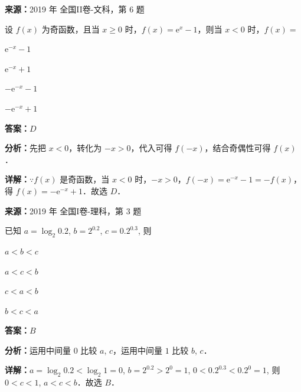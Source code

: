 \begin{question}[points=5]
\textbf{来源：}2019 年 全国II卷-文科，第 6 题\par
设 $f(x)$ 为奇函数，且当 $x\geq 0$ 时，$f(x)=\mathrm{e}^x-1$，则当 $x<0$ 时，$f(x)=$
\begin{choices}
  \item $\mathrm{e}^{-x}-1$
  \item $\mathrm{e}^{-x}+1$
  \item $-\mathrm{e}^{-x}-1$
  \item $-\mathrm{e}^{-x}+1$
\end{choices}
\begin{solution}
\textbf{答案：}$D$

\textbf{分析：}先把 $x<0$，转化为 $-x>0$，代入可得 $f(-x)$，结合奇偶性可得 $f(x)$．

\textbf{详解：}$\because f(x)$ 是奇函数，当 $x<0$ 时，$-x>0$，$f(-x)=\mathrm{e}^{-x}-1=-f(x)$，得 $f(x)=-\mathrm{e}^{-x}+1$．故选 $D$．
\end{solution}
\end{question}

\begin{question}[points=5]
\textbf{来源：}2019 年 全国I卷-理科，第 3 题\par
已知 $a = \log_2 0.2$, $b = 2^{0.2}$, $c = 0.2^{0.3}$, 则
\begin{choices}
  \item $a < b < c$
  \item $a < c < b$
  \item $c < a < b$
  \item $b < c < a$
\end{choices}
\begin{solution}
\textbf{答案：}$B$

\textbf{分析：}运用中间量 $0$ 比较 $a$, $c$，运用中间量 $1$ 比较 $b$, $c$．

\textbf{详解：}$a = \log_2 0.2 < \log_2 1 = 0$, $b = 2^{0.2} > 2^0 = 1$, $0 < 0.2^{0.3} < 0.2^0 = 1$, 则 $0 < c < 1$, $a < c < b$．故选 $B$．
\end{solution}
\end{question}


